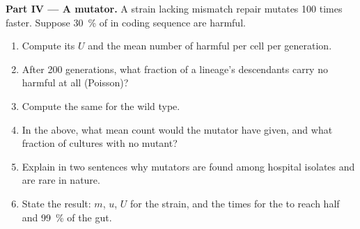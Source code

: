 \begin{problem}
\medskip
\noindent\textbf{Part IV --- A mutator.}
A strain lacking mismatch repair mutates \num{100} times faster.
Suppose \qty{30}{\%} of  in coding sequence are harmful.
\begin{enumerate}[resume]
  \item Compute its $U$ and the mean number of harmful  per
        cell per generation.
  \item After \num{200} generations, what fraction of a lineage's
        descendants carry no harmful  at all (Poisson)?
  \item Compute the same for the wild type.
  \item In the  above, what mean count would the
        mutator have given, and what fraction of cultures with no
        mutant?
  \item Explain in two sentences why mutators are found among
        hospital isolates and are rare in nature.
  \item State the result: $m$, $u$, $U$ for the strain, and the times
        for the  to reach half and \qty{99}{\%} of the gut.
\end{enumerate}
\end{problem}
